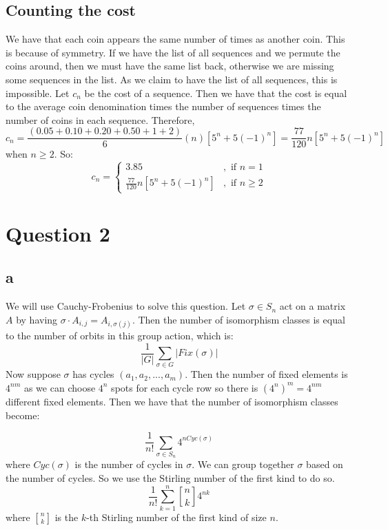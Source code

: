 \documentclass[]{article}
\theoremstyle{definition}
\numberwithin{theorem}{section}
\numberwithin{equation}{section}
\newcommand{\genstirlingI}[3]{%
	\genfrac{[}{]}{0pt}{#1}{#2}{#3}%
}
\newcommand{\stirlingI}[2]{\genstirlingI{}{#1}{#2}}
\begin{document}
\subsection{Counting the cost}
We have that each coin appears the same number of times as another coin. This is because of symmetry. If we have the list of all sequences and we permute the coins around, then we must have the same list back, otherwise we are missing some sequences in the list. As we claim to have the list of all sequences, this is impossible. Let $c_n$ be the cost of a sequence. Then we have that the cost is equal to the average coin denomination times the number of sequences times the number of coins in each sequence. Therefore,
\begin{equation}
	c_n = \frac{(0.05 + 0.10 + 0.20 + 0.50 + 1 + 2) }{6}(n) \left[5^n + 5(-1)^n \right] =  \frac{77}{120} n \left[5^n + 5(-1)^n \right]
\end{equation}
when $n \geq 2$.
So:
\begin{equation}
	c_n = 
	\begin{cases}
		3.85 &, \text{ if } n = 1\\
		\frac{77}{120} n \left[5^n + 5(-1)^n \right] &, \text{ if } n \geq 2
	\end{cases}
\end{equation}

\section{Question 2}

\subsection{a}
We will use Cauchy-Frobenius to solve this question. Let $\sigma \in S_n $ act on a matrix $A$ by having $\sigma \cdot A_{i, j} = A_{i, \sigma(j)}$. Then the number of isomorphism classes is equal to the number of orbits in this group action, which is:
\begin{equation}
	\frac{1}{|G|} \sum_{\sigma \in G} |Fix(\sigma)|
\end{equation}
Now suppose $\sigma$ has cycles $(a_1, a_2, ..., a_m)$. Then the number of fixed elements is $4^{n m}$ as we can choose $4^n$ spots for each cycle row so there is $(4^n)^m = 4^{n m}$ different fixed elements. Then we have that the number of isomorphism classes become:

\begin{equation}
	\frac{1}{n!} \sum_{\sigma \in S_n} 4^{n Cyc(\sigma)}
\end{equation}
where $Cyc(\sigma)$ is the number of cycles in $\sigma$. We can group together $\sigma$ based on the number of cycles. So we use the Stirling number of the first kind to do so.
\begin{equation}
	\frac{1}{n!} \sum_{k = 1}^n \stirlingI{n}{k} 4^{n k}
\end{equation}
where $\stirlingI{n}{k}$ is the $k$-th Stirling number of the first kind of size $n$. 
\end{document}
